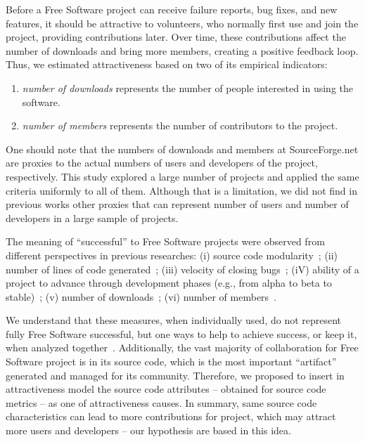 \documentclass[conference]{IEEEtran}
\begin{document}
%
Before a Free Software project can receive failure reports, bug fixes, 
and new features, it should be attractive to volunteers, who normally first
use and join the project, providing contributions later.
%
Over time, these contributions affect the number of downloads and bring more 
members, creating a positive feedback loop.
%
Thus, we estimated attractiveness based on two of its empirical indicators:
\begin{enumerate}
\item \emph{number of downloads} represents the number of people
interested in using the software.
\item \emph{number of members} represents the number of contributors to the project.
\end{enumerate}


One should note that the numbers of downloads and members at SourceForge.net
are proxies to the actual numbers of users and developers of the project, respectively.
%
This study explored a large number of projects and applied the same criteria
uniformly to all of them. 
%
Although that is a limitation, we did not find in previous works other proxies
that can represent number of users and number of developers in a large sample of projects.

The meaning of ``successful'' to Free Software projects were
observed from different perspectives in previous researches:
%
(i) source code modularity~\cite{shaikh2003};
(ii) number of lines of code generated~\cite{mockus2000};
(iii) velocity of closing bugs~\cite{Stewart2006};
(iV) ability of a project to advance through development phases
(e.g., from alpha to beta to stable)~\cite{raja2006,Crowston2002};
(v) number of downloads~\cite{balijepally2009};
(vi) number of members~\cite{crowston2006}.

We understand that these measures, when individually used, do not represent
fully Free Software successful, but one ways to help to achieve success,
or keep it, when analyzed together~\cite{Santos2010}.
%
Additionally, the vast majority of collaboration for Free Software project
is in its source code, which is the most important ``artifact'' generated and
managed for its community.
%
Therefore, we proposed to insert in attractiveness model the source code
attributes -- obtained for source code metrics -- as one of attractiveness causes.
%
In summary, same source code characteristics can lead to more contributions for
project, which may attract more users and developers -- our hypothesis are based
in this idea.
\end{document}
